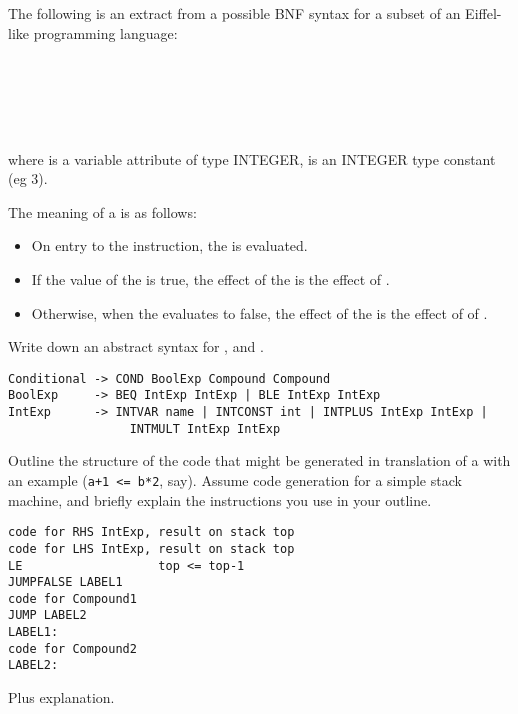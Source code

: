 \begin{questions}
\begin{subquestions}
\subquestion
The following is an extract from a possible BNF syntax for
a subset of an Eiffel-like programming language: 
\begin{bnf}
 \\
 \\
\\
\\
\end{bnf}
where  is a variable attribute of type INTEGER, 
is an INTEGER type constant (eg 3).

The meaning of a  is as follows:
\begin{itemize}
\item On entry to the instruction, the  is 
	evaluated. 
\item If the value of the  is true, the effect of
	the  is the effect of .
\item Otherwise, when the  evaluates to false,
	the effect of the  is the effect of
	of .
\end{itemize}
\begin{subsubquestions}
\subsubquestion
Write down an abstract syntax for , 
 and .
\begin{modelanswer}
\begin{verbatim}
Conditional -> COND BoolExp Compound Compound
BoolExp     -> BEQ IntExp IntExp | BLE IntExp IntExp
IntExp      -> INTVAR name | INTCONST int | INTPLUS IntExp IntExp |
                 INTMULT IntExp IntExp
\end{verbatim}
\end{modelanswer}
\subsubquestion
	Outline the structure of the
        code that might be generated in translation of
        a  with an example 
	 (\verb"a+1 <= b*2", say). 
	Assume code generation for a simple
        stack machine, and briefly explain the
	instructions you use in your outline.
\begin{modelanswer}
\begin{verbatim}
code for RHS IntExp, result on stack top
code for LHS IntExp, result on stack top
LE                   top <= top-1
JUMPFALSE LABEL1
code for Compound1
JUMP LABEL2
LABEL1:
code for Compound2
LABEL2:
\end{verbatim}
Plus explanation.
\end{modelanswer}


\end{subsubquestions}
\end{subquestions}
\end{questions}
